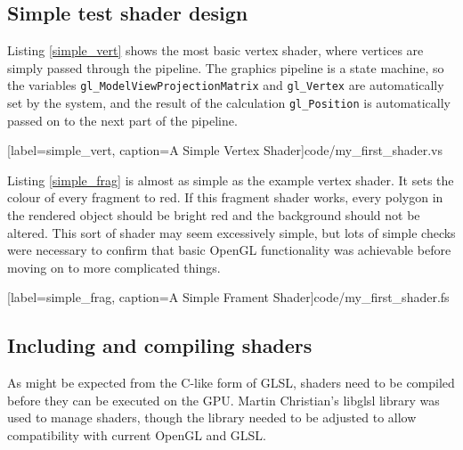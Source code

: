 \documentclass[MSc,paper=a4,pagesize=auto]{icldt}
\begin{document}
\subsection{Simple test shader design}
Listing \ref{simple_vert} shows the most basic vertex shader, where vertices are simply passed through the pipeline. The graphics pipeline is a state machine, so the variables \texttt{gl\_ModelViewProjectionMatrix} and \texttt{gl\_Vertex} are automatically set by the system, and the result of the calculation \texttt{gl\_Position} is automatically passed on to the next part of the pipeline.


  [label=simple_vert, caption=A Simple Vertex Shader]{code/my_first_shader.vs}

Listing \ref{simple_frag} is almost as simple as the example vertex shader. It sets the colour of every fragment to red. If this fragment shader works, every polygon in the rendered object should be bright red and the background should not be altered. This sort of shader may seem excessively simple, but lots of simple checks were necessary to confirm that basic OpenGL functionality was achievable before moving on to more complicated things.


  [label=simple_frag, caption=A Simple Frament Shader]{code/my_first_shader.fs}

\subsection{Including and compiling shaders}

As might be expected from the C-like form of GLSL, shaders need to be compiled before they can be executed on the GPU. Martin Christian's libglsl library was used to manage shaders, though the library needed to be adjusted to allow compatibility with current OpenGL and GLSL. 
\end{document}
